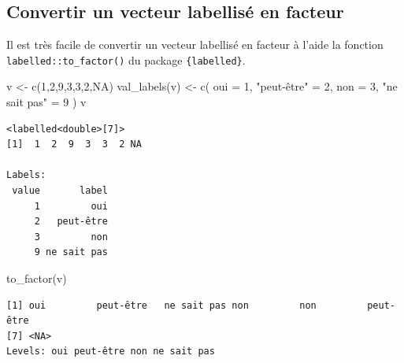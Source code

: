 \documentclass[
  letterpaper,
  DIV=11,
  numbers=noendperiod,
  oneside]{scrreprt}
\newenvironment{Shaded}{\begin{snugshade}}{\end{snugshade}}
\newcommand{\AttributeTok}[1]{\textcolor[rgb]{0.40,0.45,0.13}{#1}}
\newcommand{\ConstantTok}[1]{\textcolor[rgb]{0.56,0.35,0.01}{#1}}
\newcommand{\DecValTok}[1]{\textcolor[rgb]{0.68,0.00,0.00}{#1}}
\newcommand{\FunctionTok}[1]{\textcolor[rgb]{0.28,0.35,0.67}{#1}}
\newcommand{\NormalTok}[1]{\textcolor[rgb]{0.00,0.23,0.31}{#1}}
\newcommand{\OtherTok}[1]{\textcolor[rgb]{0.00,0.23,0.31}{#1}}
\newcommand{\StringTok}[1]{\textcolor[rgb]{0.13,0.47,0.30}{#1}}
\begin{document}
\hypertarget{convertir-un-vecteur-labellisuxe9-en-facteur}{%
\subsection{Convertir un vecteur labellisé en
facteur}\label{convertir-un-vecteur-labellisuxe9-en-facteur}}

Il est très facile de convertir un vecteur labellisé en facteur à l'aide
la fonction \texttt{labelled::to\_factor()} du package
\texttt{\{labelled\}}.

\begin{Shaded}
\begin{Highlighting}[]
\NormalTok{v }\OtherTok{\textless{}{-}} \FunctionTok{c}\NormalTok{(}\DecValTok{1}\NormalTok{,}\DecValTok{2}\NormalTok{,}\DecValTok{9}\NormalTok{,}\DecValTok{3}\NormalTok{,}\DecValTok{3}\NormalTok{,}\DecValTok{2}\NormalTok{,}\ConstantTok{NA}\NormalTok{)}
\FunctionTok{val\_labels}\NormalTok{(v) }\OtherTok{\textless{}{-}} \FunctionTok{c}\NormalTok{(}
  \AttributeTok{oui =} \DecValTok{1}\NormalTok{, }\StringTok{"peut{-}être"} \OtherTok{=} \DecValTok{2}\NormalTok{, }
  \AttributeTok{non =} \DecValTok{3}\NormalTok{, }\StringTok{"ne sait pas"} \OtherTok{=} \DecValTok{9}
\NormalTok{)}
\NormalTok{v}
\end{Highlighting}
\end{Shaded}

\begin{verbatim}
<labelled<double>[7]>
[1]  1  2  9  3  3  2 NA

Labels:
 value       label
     1         oui
     2   peut-être
     3         non
     9 ne sait pas
\end{verbatim}

\begin{Shaded}
\begin{Highlighting}[]
\FunctionTok{to\_factor}\NormalTok{(v)}
\end{Highlighting}
\end{Shaded}

\begin{verbatim}
[1] oui         peut-être   ne sait pas non         non         peut-être  
[7] <NA>       
Levels: oui peut-être non ne sait pas
\end{verbatim}
\end{document}
